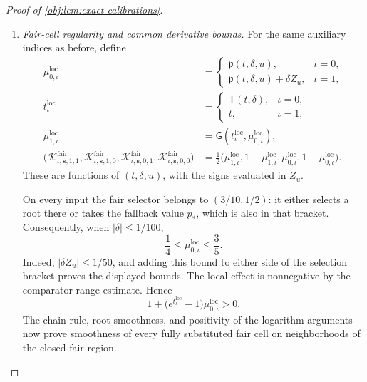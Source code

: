 \begin{proof}[Proof of \cref{obj:lem:exact-calibrations}]
\begin{enumerate}
Apply this first to
\(\varphi(\delta')=\mathfrak p(t,\delta',u)\), and then to
\(\varphi(\delta')=\partial_u\mathfrak p(t,\delta',u)\), with \(t,u\) fixed in their prescribed ranges. Both functions are smooth and even. Their zero-amplitude values are respectively \(p_*\) and \(0\). For the latter value, constancy of
\(\mathfrak p(t,0,u)=p_*\) on \([0,1]\) forces the spatial derivative to vanish also at \(u=0,1\): the available two-sided derivative equals the zero one-sided derivative from the interval. Therefore
\[
|\mathfrak p(t,\delta,u)-p_*|
\le B_{\mathrm{quad}}\delta^2,
\qquad
|\partial_u\mathfrak p(t,\delta,u)|
\le B_{\mathrm{quad}}\delta^2,
\]
and hence
\[
|\mathfrak p(t,\delta,u)-p_*|
+|\partial_u\mathfrak p(t,\delta,u)|
\le M\delta^2
\quad\hbox{on }\mathcal P_{\mathrm{fair}}(\varepsilon_0).
\]

\item \emph{Fair-cell regularity and common derivative bounds.}
For the same auxiliary indices as before, define
\[
\begin{aligned}
\mu^{\mathrm{loc}}_{0,\iota}
&=
\begin{cases}
\mathfrak p(t,\delta,u),&\iota=0,\\
\mathfrak p(t,\delta,u)+\delta Z_u,&\iota=1,
\end{cases}\\
t^{\mathrm{loc}}_\iota
&=
\begin{cases}
\mathsf T(t,\delta),&\iota=0,\\
t,&\iota=1,
\end{cases}\\
\mu^{\mathrm{loc}}_{1,\iota}
&=\mathsf G(t^{\mathrm{loc}}_\iota,\mu^{\mathrm{loc}}_{0,\iota}),\\
\bigl(
\mathcal K^{\mathrm{fair}}_{\iota,\boldsymbol{s},1,1},
\mathcal K^{\mathrm{fair}}_{\iota,\boldsymbol{s},1,0},
\mathcal K^{\mathrm{fair}}_{\iota,\boldsymbol{s},0,1},
\mathcal K^{\mathrm{fair}}_{\iota,\boldsymbol{s},0,0}
\bigr)
&=
\frac12\bigl(
\mu^{\mathrm{loc}}_{1,\iota},
1-\mu^{\mathrm{loc}}_{1,\iota},
\mu^{\mathrm{loc}}_{0,\iota},
1-\mu^{\mathrm{loc}}_{0,\iota}
\bigr).
\end{aligned}
\]
These are functions of \((t,\delta,u)\), with the signs evaluated in \(Z_u\).

On every input the fair selector belongs to \((3/10,1/2)\): it either selects a root there or takes the fallback value \(p_*\), which is also in that bracket. Consequently, when \(|\delta|\le1/100\),
\[
\frac14\le\mu^{\mathrm{loc}}_{0,\iota}\le\frac35.
\]
Indeed, \(|\delta Z_u|\le1/50\), and adding this bound to either side of the selection bracket proves the displayed bounds. The local effect is nonnegative by the comparator range estimate. Hence
\[
1+\bigl(e^{t^{\mathrm{loc}}_\iota}-1\bigr)
\mu^{\mathrm{loc}}_{0,\iota}>0.
\]
The chain rule, root smoothness, and positivity of the logarithm arguments now prove smoothness of every fully substituted fair cell on neighborhoods of the closed fair region.


\end{enumerate}
\end{proof}
